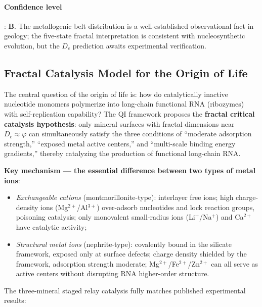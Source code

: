 \documentclass[12pt,a4paper,twocolumn]{article}
\renewcommand{\phi}{\varphi}
\begin{document}
\paragraph{Confidence level}: \textbf{B}. The metallogenic belt distribution is a well-established observational fact in geology; the five-state fractal interpretation is consistent with nucleosynthetic evolution, but the $D_c$ prediction awaits experimental verification.

\subsection{Fractal Catalysis Model for the Origin of Life}
\label{subsec:life_origin}

The central question of the origin of life is: how do catalytically inactive nucleotide monomers polymerize into long-chain functional RNA (ribozymes) with self-replication capability? The QI framework proposes the \textbf{fractal critical catalysis hypothesis}: only mineral surfaces with fractal dimensions near $D_c \approx \phi$ can simultaneously satisfy the three conditions of ``moderate adsorption strength,'' ``exposed metal active centers,'' and ``multi-scale binding energy gradients,'' thereby catalyzing the production of functional long-chain RNA.

\textbf{Key mechanism --- the essential difference between two types of metal ions}:
\begin{itemize}
\item \textit{Exchangeable cations} (montmorillonite-type): interlayer free ions; high charge-density ions (Mg$^{2+}$/Al$^{3+}$) over-adsorb nucleotides and lock reaction groups, poisoning catalysis; only monovalent small-radius ions (Li$^+$/Na$^+$) and Ca$^{2+}$ have catalytic activity;
\item \textit{Structural metal ions} (nephrite-type): covalently bound in the silicate framework, exposed only at surface defects; charge density shielded by the framework, adsorption strength moderate; Mg$^{2+}$/Fe$^{2+}$/Zn$^{2+}$ can all serve as active centers without disrupting RNA higher-order structure.
\end{itemize}

The three-mineral staged relay catalysis fully matches published experimental results:
\end{document}
